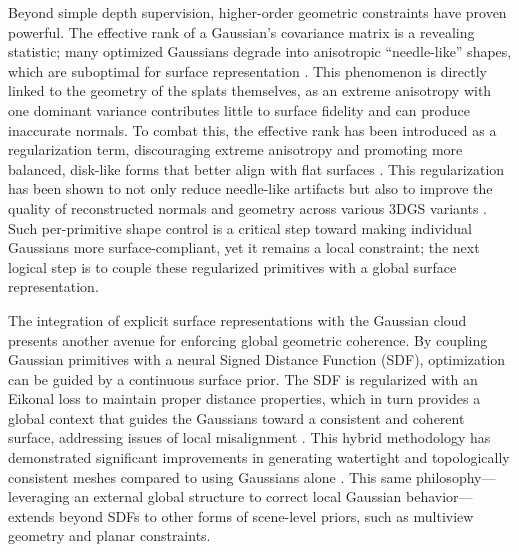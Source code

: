 \documentclass[11pt]{article}
\begin{document}
Beyond simple depth supervision, higher-order geometric constraints have proven powerful. The effective rank of a Gaussian's covariance matrix is a revealing statistic; many optimized Gaussians degrade into anisotropic ``needle-like'' shapes, which are suboptimal for surface representation \cite{ref9}. This phenomenon is directly linked to the geometry of the splats themselves, as an extreme anisotropy with one dominant variance contributes little to surface fidelity and can produce inaccurate normals. To combat this, the effective rank has been introduced as a regularization term, discouraging extreme anisotropy and promoting more balanced, disk-like forms that better align with flat surfaces \cite{ref9,ref187}. This regularization has been shown to not only reduce needle-like artifacts but also to improve the quality of reconstructed normals and geometry across various 3DGS variants \cite{ref9}. Such per-primitive shape control is a critical step toward making individual Gaussians more surface-compliant, yet it remains a local constraint; the next logical step is to couple these regularized primitives with a global surface representation.

The integration of explicit surface representations with the Gaussian cloud presents another avenue for enforcing global geometric coherence. By coupling Gaussian primitives with a neural Signed Distance Function (SDF), optimization can be guided by a continuous surface prior. The SDF is regularized with an Eikonal loss to maintain proper distance properties, which in turn provides a global context that guides the Gaussians toward a consistent and coherent surface, addressing issues of local misalignment \cite{ref187,ref188}. This hybrid methodology has demonstrated significant improvements in generating watertight and topologically consistent meshes compared to using Gaussians alone \cite{ref188}. This same philosophy---leveraging an external global structure to correct local Gaussian behavior---extends beyond SDFs to other forms of scene-level priors, such as multiview geometry and planar constraints.
\end{document}
